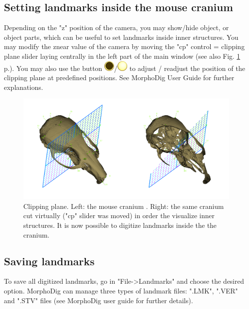 \documentclass[12pt, a4paper]{book}
\begin{document}
\subsection{Setting landmarks inside the mouse cranium}
Depending on the "z" position of the camera, you may show/hide object, or object parts, which can be useful to set landmarks inside inner structures. You may modify the znear value of the camera by moving the "cp" control = clipping plane slider laying centrally in the left part of the main window (see also Fig. \ref{clipping} p.\pageref{clipping}). You may also use the button \includegraphics[scale=0.7]{../images/06/display/cpon.png}/\includegraphics[scale=0.5]{../images/06/display/cpoff.png}  to adjust / readjust the position of the clipping plane at predefined positions. See MorphoDig User Guide for further explanations. 
\begin{figure}
  \centering
  \includegraphics[scale=0.3]{clipping.png} 
	\caption{Clipping plane.  Left: the mouse cranium . Right: the same cranium cut virtually ("cp" slider was moved) in order the visualize inner structures. It is now possible to digitize landmarks inside the the cranium.}
\label{clipping}
 
\end{figure}

\subsection{Saving landmarks}
To save all digitized landmarks, go in "File->Landmarks" and choose the desired option. MorphoDig can manage three types of landmark files: ".LMK", ".VER" and ".STV" files (see MorphoDig user guide for further details).
\end{document}
